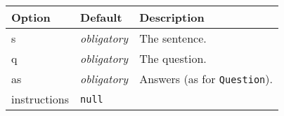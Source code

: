 \documentclass[
]{article}
\begin{document}
\begin{RaggedRight}\small\begin{longtable}[]{p{1.7in}p{1in}p{3.15in}}
\toprule
\begin{minipage}[b]{0.17\columnwidth}\raggedright
\textbf{Option}\strut
\end{minipage} & \begin{minipage}[b]{0.25\columnwidth}\raggedright
\textbf{Default}\strut
\end{minipage} & \begin{minipage}[b]{0.49\columnwidth}\raggedright
\textbf{Description}\strut
\end{minipage}\tabularnewline
\midrule
\endhead
\begin{minipage}[t]{0.17\columnwidth}\raggedright
s\strut
\end{minipage} & \begin{minipage}[t]{0.25\columnwidth}\raggedright
\emph{obligatory}\strut
\end{minipage} & \begin{minipage}[t]{0.49\columnwidth}\raggedright
The sentence.\strut
\end{minipage}\tabularnewline
\begin{minipage}[t]{0.17\columnwidth}\raggedright
q\strut
\end{minipage} & \begin{minipage}[t]{0.25\columnwidth}\raggedright
\emph{obligatory}\strut
\end{minipage} & \begin{minipage}[t]{0.49\columnwidth}\raggedright
The question.\strut
\end{minipage}\tabularnewline
\begin{minipage}[t]{0.17\columnwidth}\raggedright
as\strut
\end{minipage} & \begin{minipage}[t]{0.25\columnwidth}\raggedright
\emph{obligatory}\strut
\end{minipage} & \begin{minipage}[t]{0.49\columnwidth}\raggedright
Answers (as for \texttt{Question}).\strut
\end{minipage}\tabularnewline
\begin{minipage}[t]{0.17\columnwidth}\raggedright
instructions\strut
\end{minipage} & \begin{minipage}[t]{0.25\columnwidth}\raggedright
\texttt{null}\strut
\end{minipage} & \begin{minipage}[t]{0.49\columnwidth}\raggedright

\end{minipage}
\end{longtable}
\end{RaggedRight}
\end{document}
